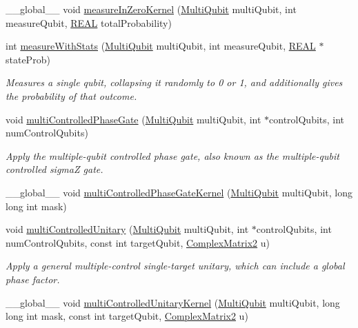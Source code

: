 \begin{DoxyCompactItemize}
\+\_\+\+\_\+global\+\_\+\+\_\+ void \mbox{\hyperlink{QuEST__env__localGPU_8cu_a8f87a4777c69c875fece83d4b5eb29ba}{measure\+In\+Zero\+Kernel}} (\mbox{\hyperlink{structMultiQubit}{Multi\+Qubit}} multi\+Qubit, int measure\+Qubit, \mbox{\hyperlink{QuEST__precision_8h_a4b654506f18b8bfd61ad2a29a7e38c25}{R\+E\+AL}} total\+Probability)
\item 
int \mbox{\hyperlink{QuEST__env__localGPU_8cu_a2ac46e470c750bf93c754e06c64b0a7a}{measure\+With\+Stats}} (\mbox{\hyperlink{structMultiQubit}{Multi\+Qubit}} multi\+Qubit, int measure\+Qubit, \mbox{\hyperlink{QuEST__precision_8h_a4b654506f18b8bfd61ad2a29a7e38c25}{R\+E\+AL}} $\ast$state\+Prob)
\begin{DoxyCompactList}\small\item\em Measures a single qubit, collapsing it randomly to 0 or 1, and additionally gives the probability of that outcome. \end{DoxyCompactList}\item 
void \mbox{\hyperlink{QuEST__env__localGPU_8cu_afc1835c6b43b6e59ce7df7b13f274fc7}{multi\+Controlled\+Phase\+Gate}} (\mbox{\hyperlink{structMultiQubit}{Multi\+Qubit}} multi\+Qubit, int $\ast$control\+Qubits, int num\+Control\+Qubits)
\begin{DoxyCompactList}\small\item\em Apply the multiple-\/qubit controlled phase gate, also known as the multiple-\/qubit controlled sigmaZ gate. \end{DoxyCompactList}\item 
\+\_\+\+\_\+global\+\_\+\+\_\+ void \mbox{\hyperlink{QuEST__env__localGPU_8cu_a31833a4edc084f5bcdbf10ee6845064a}{multi\+Controlled\+Phase\+Gate\+Kernel}} (\mbox{\hyperlink{structMultiQubit}{Multi\+Qubit}} multi\+Qubit, long long int mask)
\item 
void \mbox{\hyperlink{QuEST__env__localGPU_8cu_aa29551d2d5c883891faa75a4741dc71a}{multi\+Controlled\+Unitary}} (\mbox{\hyperlink{structMultiQubit}{Multi\+Qubit}} multi\+Qubit, int $\ast$control\+Qubits, int num\+Control\+Qubits, const int target\+Qubit, \mbox{\hyperlink{structComplexMatrix2}{Complex\+Matrix2}} u)
\begin{DoxyCompactList}\small\item\em Apply a general multiple-\/control single-\/target unitary, which can include a global phase factor. \end{DoxyCompactList}\item 
\+\_\+\+\_\+global\+\_\+\+\_\+ void \mbox{\hyperlink{QuEST__env__localGPU_8cu_af76f428eec6053839eb228152a51b5e3}{multi\+Controlled\+Unitary\+Kernel}} (\mbox{\hyperlink{structMultiQubit}{Multi\+Qubit}} multi\+Qubit, long long int mask, const int target\+Qubit, \mbox{\hyperlink{structComplexMatrix2}{Complex\+Matrix2}} u)

\end{DoxyCompactItemize}
